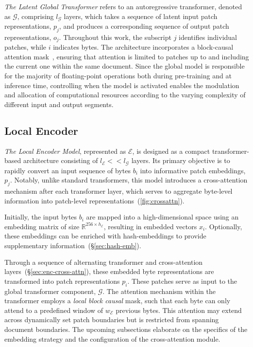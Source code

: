 \textit{The Latent Global Transformer} refers to an autoregressive transformer, denoted as $\mathcal{G}$, comprising $l_{\mathcal{G}}$ layers, which takes a sequence of latent input patch representations, $p_j$, and produces a corresponding sequence of output patch representations, $o_j$. Throughout this work, the subscript $j$ identifies individual patches, while $i$ indicates bytes. The architecture incorporates a block-causal attention mask~\citep{dubey2024llama}, ensuring that attention is limited to patches up to and including the current one within the same document. Since the global model is responsible for the majority of floating-point operations both during pre-training and at inference time, controlling when the model is activated enables the modulation and allocation of computational resources according to the varying complexity of different input and output segments.

\subsection{Local Encoder}
\label{section:local}

\textit{The Local Encoder Model}, represented as $\mathcal{E}$, is designed as a compact transformer-based architecture consisting of $l_{\mathcal{E}} << l_{\mathcal{G}}$ layers. Its primary objective is to rapidly convert an input sequence of bytes $b_i$ into informative patch embeddings, $p_j$. Notably, unlike standard transformers, this model introduces a cross-attention mechanism after each transformer layer, which serves to aggregate byte-level information into patch-level representations~(\autoref{fig:crossattn}).

Initially, the input bytes $b_i$ are mapped into a high-dimensional space using an embedding matrix of size $\mathbb{R}^{256 \times h_{\mathcal{E}}}$, resulting in embedded vectors $x_i$. Optionally, these embeddings can be enriched with hash-embeddings to provide supplementary information~(\S\ref{sec:hash-emb}).

Through a sequence of alternating transformer and cross-attention layers~(\S\ref{sec:enc-cross-attn}), these embedded byte representations are transformed into patch representations $p_i$. These patches serve as input to the global transformer component, $\mathcal{G}$. The attention mechanism within the transformer employs a \textit{local block causal} mask, such that each byte can only attend to a predefined window of $w_{\mathcal{E}}$ previous bytes. This attention may extend across dynamically set patch boundaries but is restricted from spanning document boundaries. The upcoming subsections elaborate on the specifics of the embedding strategy and the configuration of the cross-attention module.

